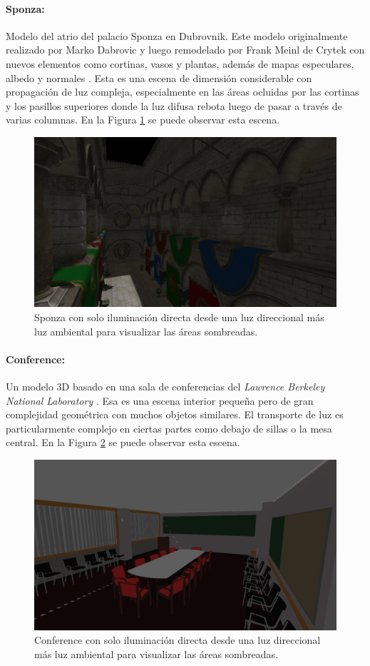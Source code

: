 \paragraph{Sponza:} Modelo del atrio del palacio Sponza en Dubrovnik. Este modelo originalmente realizado por Marko Dabrovic y luego remodelado por Frank Meinl de Crytek con nuevos elementos como cortinas, vasos y plantas, además de mapas especulares, albedo y normales \cite{sponza_model}. Esta es una escena de dimensión considerable con propagación de luz compleja, especialmente en las áreas ocluidas por las cortinas y los pasillos superiores donde la luz difusa rebota luego de pasar a través de varias columnas. En la Figura \ref{fig:crytek_sponza} se puede observar esta escena.

\begin{figure}[H]
	\centering
	\includegraphics[width=0.65\linewidth]{media/scenes/sponza.png}
	\caption{Sponza con solo iluminación directa desde una luz direccional más luz ambiental para visualizar las áreas sombreadas.}
	\label{fig:crytek_sponza}
\end{figure}

\paragraph{Conference:} Un modelo 3D basado en una sala de conferencias del \emph{Lawrence Berkeley National Laboratory} \cite{conference_model}. Esa es una escena interior pequeña pero de gran complejidad geométrica con muchos objetos similares. El transporte de luz es particularmente complejo en ciertas partes como debajo de sillas o la mesa central. En la Figura \ref{fig:conference} se puede observar esta escena.

\begin{figure}[H]
	\centering
	\includegraphics[width=0.65\linewidth]{media/scenes/conference.png}
	\caption{Conference con solo iluminación directa desde una luz direccional más luz ambiental para visualizar las áreas sombreadas.}
	\label{fig:conference}
\end{figure}

